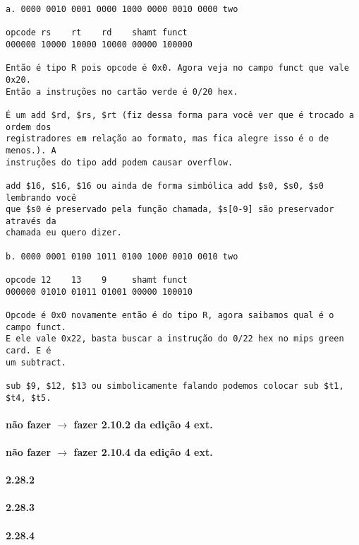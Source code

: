 \documentclass{article}
\begin{document}
\begin{verbatim}
a. 0000 0010 0001 0000 1000 0000 0010 0000 two

opcode rs    rt    rd    shamt funct
000000 10000 10000 10000 00000 100000

Então é tipo R pois opcode é 0x0. Agora veja no campo funct que vale 0x20. 
Então a instruções no cartão verde é 0/20 hex.

É um add $rd, $rs, $rt (fiz dessa forma para você ver que é trocado a ordem dos 
registradores em relação ao formato, mas fica alegre isso é o de menos.). A  
instruções do tipo add podem causar overflow.

add $16, $16, $16 ou ainda de forma simbólica add $s0, $s0, $s0 lembrando você 
que $s0 é preservado pela função chamada, $s[0-9] são preservador através da 
chamada eu quero dizer.

b. 0000 0001 0100 1011 0100 1000 0010 0010 two

opcode 12    13    9     shamt funct
000000 01010 01011 01001 00000 100010

Opcode é 0x0 novamente então é do tipo R, agora saibamos qual é o campo funct. 
E ele vale 0x22, basta buscar a instrução do 0/22 hex no mips green card. E é 
um subtract.

sub $9, $12, $13 ou simbolicamente falando podemos colocar sub $t1, $t4, $t5.
\end{verbatim}

\paragraph{não fazer  $\rightarrow$ fazer 2.10.2 da edição 4 ext.}
\paragraph{não fazer  $\rightarrow$ fazer 2.10.4 da edição 4 ext.}
\paragraph{2.28.2}
\paragraph{2.28.3}
\paragraph{2.28.4}
\end{document}
